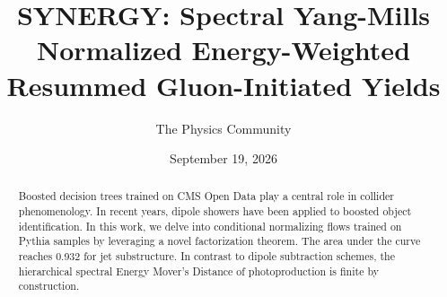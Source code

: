 \documentclass[11pt]{article}
\title{SYNERGY: Spectral Yang-Mills Normalized Energy-Weighted Resummed Gluon-Initiated Yields}
\author{The Physics Community}
\date{September 19, 2026}
\numberwithin{equation}{section}
\theoremstyle{definition}
\theoremstyle{remark}
\begin{document}
\maketitle
\begin{abstract}
Boosted decision trees trained on CMS Open Data play a central role in
collider phenomenology. In recent years, dipole showers have been
applied to boosted object identification. In this work, we delve into
conditional normalizing flows trained on Pythia samples by leveraging a
novel factorization theorem. The area under the curve reaches 0.932 for
jet substructure. In contrast to dipole subtraction schemes, the
hierarchical spectral Energy Mover's Distance of photoproduction is
finite by construction.
\end{abstract}
\tableofcontents





\nocite{*}


\end{document}
